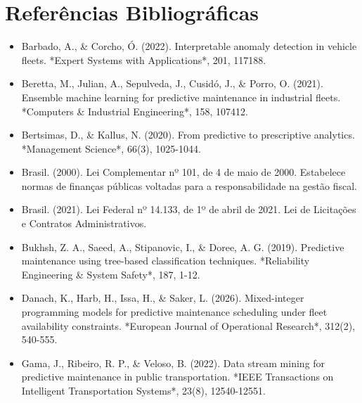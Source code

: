 \documentclass[10pt,a4paper,journal]{article}
\begin{document}
\section{Referências Bibliográficas}
\begin{itemize}
\item Barbado, A., \& Corcho, Ó. (2022). Interpretable anomaly detection in vehicle fleets. *Expert Systems with Applications*, 201, 117188.
\end{itemize}
\begin{itemize}
\item Beretta, M., Julian, A., Sepulveda, J., Cusidó, J., \& Porro, O. (2021). Ensemble machine learning for predictive maintenance in industrial fleets. *Computers \& Industrial Engineering*, 158, 107412.
\end{itemize}
\begin{itemize}
\item Bertsimas, D., \& Kallus, N. (2020). From predictive to prescriptive analytics. *Management Science*, 66(3), 1025-1044.
\end{itemize}
\begin{itemize}
\item Brasil. (2000). Lei Complementar nº 101, de 4 de maio de 2000. Estabelece normas de finanças públicas voltadas para a responsabilidade na gestão fiscal.
\end{itemize}
\begin{itemize}
\item Brasil. (2021). Lei Federal nº 14.133, de 1º de abril de 2021. Lei de Licitações e Contratos Administrativos.
\end{itemize}
\begin{itemize}
\item Bukhsh, Z. A., Saeed, A., Stipanovic, I., \& Doree, A. G. (2019). Predictive maintenance using tree-based classification techniques. *Reliability Engineering \& System Safety*, 187, 1-12.
\end{itemize}
\begin{itemize}
\item Danach, K., Harb, H., Issa, H., \& Saker, L. (2026). Mixed-integer programming models for predictive maintenance scheduling under fleet availability constraints. *European Journal of Operational Research*, 312(2), 540-555.
\end{itemize}
\begin{itemize}
\item Gama, J., Ribeiro, R. P., \& Veloso, B. (2022). Data stream mining for predictive maintenance in public transportation. *IEEE Transactions on Intelligent Transportation Systems*, 23(8), 12540-12551.
\end{itemize}
\end{document}
